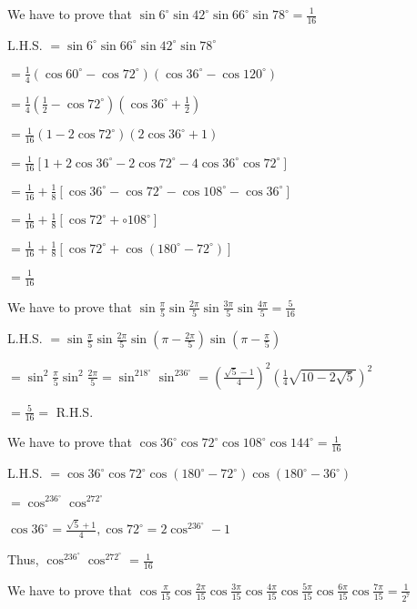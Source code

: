 \item We have to prove that $\sin6^\circ\sin42^\circ\sin66^\circ\sin78^\circ = \frac{1}{16}$

  L.H.S. $= \sin6^\circ\sin66^\circ\sin42^\circ\sin78^\circ$

  $= \frac{1}{4}(\cos60^\circ - \cos72^\circ)(\cos 36^\circ - \cos120^\circ)$

  $= \frac{1}{4}\left(\frac{1}{2} - \cos72^\circ\right)\left(\cos36^\circ + \frac{1}{2}\right)$

  $= \frac{1}{16}(1 - 2\cos72^\circ)(2\cos36^\circ + 1)$

  $= \frac{1}{16}[1 + 2\cos36^\circ - 2\cos72^\circ - 4\cos36^\circ\cos72^\circ]$

  $= \frac{1}{16} + \frac{1}{8}[\cos36^\circ - \cos72^\circ - \cos 108^\circ - \cos36^\circ]$

  $= \frac{1}{16} + \frac{1}{8}[\cos72^\circ + \circ108^\circ]$

  $= \frac{1}{16} + \frac{1}{8}[\cos72^\circ + \cos(180^\circ - 72^\circ)]$

  $= \frac{1}{16}$

\item We have to prove that $\sin\frac{\pi}{5}\sin\frac{2\pi}{5}\sin\frac{3\pi}{5}\sin\frac{4\pi}{5} = \frac{5}{16}$

  L.H.S. $= \sin\frac{\pi}{5}\sin\frac{2\pi}{5}\sin\left(\pi - \frac{2\pi}{5}\right)\sin\left(\pi - \frac{\pi}{5}\right)$

  $= \sin^2\frac{\pi}{5}\sin^2\frac{2\pi}{5} = \sin^218^\circ\sin^236^\circ = \left(\frac{\sqrt{5} -
    1}{4}\right)^2\left(\frac{1}{4}\sqrt{10 - 2\sqrt{5}}\right)^2$

  $= \frac{5}{16} =$ R.H.S.

\item We have to prove that $\cos36^\circ\cos72^\circ\cos108^\circ\cos144^\circ = \frac{1}{16}$

  L.H.S. $= \cos36^\circ\cos72^\circ\cos(180^\circ - 72^\circ)\cos(180^\circ - 36^\circ)$

  $= \cos^236^\circ\cos^272^\circ$

  $\cos 36^\circ = \frac{\sqrt{5} + 1}{4}, \cos72^\circ = 2\cos^236^\circ - 1$

  Thus, $\cos^236^\circ\cos^272^\circ = \frac{1}{16}$

\item We have to prove that
  $\cos\frac{\pi}{15}\cos\frac{2\pi}{15}\cos\frac{3\pi}{15}\cos\frac{4\pi}{15}\cos\frac{5\pi}{15}\cos\frac{6\pi}{15}\cos\frac{7\pi}{15} = \frac{1}{2^7}$

